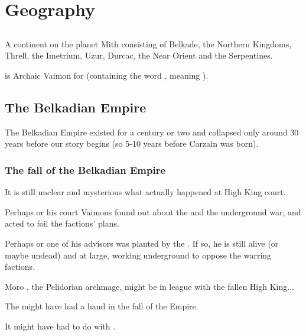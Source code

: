 \chapter{Geography}
\section{\Azmith{}}
\index{\Azmith}
\label{\Azmith}
A continent on the planet Mith consisting of Belkade, the Northern Kingdoms, Threll, the Imetrium, Uzur, Durcac, the Near Orient and the Serpentines. %

\quo{\Azmith} is Archaic Vaimon for  (containing the word , meaning ). 









\section{The Belkadian Empire}
The Belkadian Empire existed for a century or two and collapsed only around 30 years before our story begins (so 5-10 years before Carzain was born). 









\subsection{The fall of the Belkadian Empire}
It is still unclear and mysterious what actually happened at High King \LastHighKingz{} court. 

Perhaps \LastHighKing{} or his court Vaimons found out about the \Charade{} and the underground war, and acted to foil the factions' plans. 

Perhaps \LastHighKing{} or one of his advisors was planted by the \cuezcans{}. If so, he is still alive (or maybe undead) and at large, working underground to oppose the warring factions. 

Moro \Cornel, the Pelidorian archmage, might be in league with the fallen High King...

The \hs{\Kezeradi} might have had a hand in the fall of the Empire.

It might have had to do with \hs{\Semiza}. 







